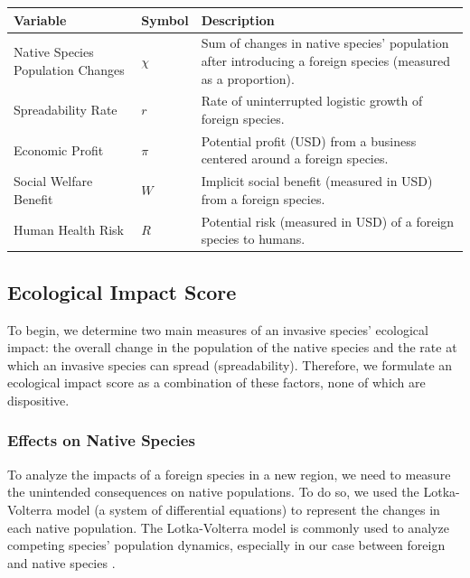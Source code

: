 \begin{table}[h]
\renewcommand{\arraystretch}{1.3}
    \begin{tabularx}{\textwidth}{p{}lX}
    \toprule
    \textbf{Variable}           & \textbf{Symbol} & \textbf{Description}  \\ \midrule
    \raggedright Native Species Population Changes & $\chi$  & Sum of changes in native species' population after introducing a foreign species (measured as a proportion). \\
    \rowcolor{gray!15}
    \raggedright Spreadability Rate  & $r$  & Rate of uninterrupted logistic growth of foreign species.\\
    Economic Profit & $\pi$  & Potential profit (USD) from a business centered around a foreign species. \\
    \rowcolor{gray!15} \raggedright Social Welfare Benefit& $W$   & Implicit social benefit (measured in USD) from a foreign species. \\
    \raggedright Human Health Risk & $R$ & Potential risk (measured in USD) of a foreign species to humans.\\
    \bottomrule
    \end{tabularx}
\end{table}

\subsection{Ecological Impact Score}

To begin, we determine two main measures of an invasive species' ecological impact: the overall change in the population of the native species and the rate at which an invasive species can spread (spreadability). Therefore, we formulate an ecological impact score as a combination of these factors, none of which are dispositive. 

\subsubsection{Effects on Native Species}

To analyze the impacts of a foreign species in a new region, we need to measure the unintended consequences on native populations. To do so, we used the Lotka-Volterra model (a system of differential equations) to represent the changes in each native population. The Lotka-Volterra model is commonly used to analyze competing species' population dynamics, especially in our case between foreign and native species \cite{noauthor_lotka-volterra_nodate}. 

